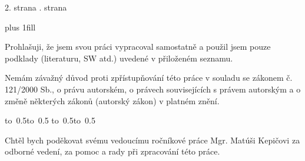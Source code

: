
\pagestyle{empty}
\hypersetup{pageanchor=false}

\maketitle

\openright
\hypersetup{pageanchor=true}
\pagestyle{plain}

2. strana
. strana
\newpage


\vglue 0pt plus 1fill


\noindent
Prohlašuji, že jsem svou práci vypracoval samostatně a použil jsem pouze podklady (literaturu, SW atd.) uvedené v přiloženém seznamu.

\medskip\noindent
Nemám závažný důvod proti zpřístupňování této práce v souladu se zákonem č. 121/2000 Sb., o právu autorském, o právech souvisejících s právem autorským a o změně některých zákonů (autorský zákon) v platném znění.

\vspace{10mm}

\hbox{\hbox to 0.5\hbox to 0.5\hsize{\dotfill\quad}}
\smallskip
\hbox{\hbox to 0.5\hsize{}\hbox to 0.5}

\vspace{20mm}
\newpage

\openright

\noindent %
Chtěl bych poděkovat svému vedoucímu ročníkové práce Mgr. Matúši Kepičovi za odborné vedení, za pomoc a rady při zpracování této práce.


\newpage

\openright
\pagestyle{plain}
\setcounter{page}{1}
